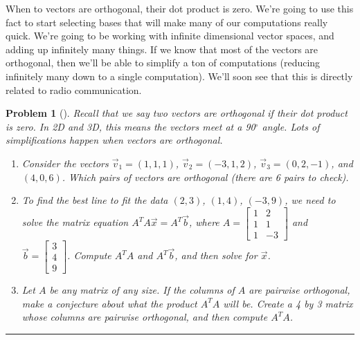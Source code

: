 \documentclass[letterpaper,oneside]{book}%
\theoremstyle{plain}
\theoremstyle{box}
\theoremstyle{problem}
\newtheorem{problemnum}{Problem}[chapter]
\newenvironment{problem}[1][]{\begin{problemnum}[#1]}{\end{problemnum}\nopagebreak\hrule\bigskip}
\newcommand{\bvec}[1]{\begin{bmatrix} #1 \end{bmatrix}}
\begin{document}
When to vectors are orthogonal, their dot product is zero.  We're going to use this fact to start selecting bases that will make many of our computations really quick. We're going to be working with infinite dimensional vector spaces, and adding up infinitely many things. If we know that most of the vectors are orthogonal, then we'll be able to simplify a ton of computations (reducing infinitely many down to a single computation).  We'll soon see that this is directly related to radio communication.
\begin{problem}
 Recall that we say two vectors are orthogonal if their dot product is zero.  
 In 2D and 3D, this means the vectors meet at a 90$^\circ$ angle. Lots of simplifications happen when vectors are orthogonal.
 \begin{enumerate}
  \item Consider the vectors $\vec v_1=(1,1,1)$, $\vec v_2 = (-3,1,2)$, $\vec v_3 = (0,2,-1)$, and $(4,0,6)$. Which pairs of vectors are orthogonal (there are 6 pairs to check).
  \item To find the best line to fit the data $(2,3)$, $(1,4)$, $(-3,9)$, we need to solve the matrix equation $A^TA\vec x = A^T\vec b$, where $A=\bvec{1&2\\1&1\\1&-3}$ and $\vec b = \bvec{3\\4\\9}$. Compute $A^TA$ and $A^T\vec b$, and then solve for $\vec x$.
  \item Let $A$ be any matrix of any size.  If the columns of $A$ are pairwise orthogonal, make a conjecture about what the product $A^TA$ will be. Create a 4 by 3 matrix whose columns are pairwise orthogonal, and then compute $A^TA$.
 \end{enumerate}
\end{problem}
\end{document}
